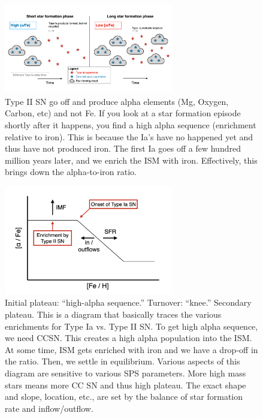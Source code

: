 \documentclass{article}
\begin{document}
\begin{figure}
    \centering
    \includegraphics[width=0.66\textwidth]{figs/Screen Shot 2021-10-13 at 9.54.53 AM.png}
    \caption{Type II SN go off and produce alpha elements (Mg, Oxygen, Carbon, etc) and not Fe. If you look at a star formation episode shortly after it happens, you find a high alpha sequence (enrichment relative to iron). This is because the Ia's have no happened yet and thus have not produced iron. The first Ia goes off a few hundred million years later, and we enrich the ISM with iron. Effectively, this brings down the alpha-to-iron ratio. }
    \label{fig:FeAlphaEnrichment}
\end{figure}

\begin{figure}
    \centering
    \includegraphics[width=0.66\textwidth]{figs/Screen Shot 2021-10-13 at 9.57.30 AM.png}
    \caption{Initial plateau: ``high-alpha sequence.'' Turnover: ``knee.'' Secondary plateau. This is a diagram that basically traces the various enrichments for Type Ia vs. Type II SN. To get high alpha sequence, we need CCSN. This creates a high alpha population into the ISM. At some time, ISM gets enriched with iron and we have a drop-off in the ratio. Then, we settle in equilibrium. Various aspects of this diagram are sensitive to various SPS parameters. More high mass stars means more CC SN and thus high plateau. The exact shape and slope, location, etc., are set by the balance of star formation rate and inflow/outflow.  }
    \label{fig:AlphaFeAbundanceEnrichment}
\end{figure}
\end{document}
